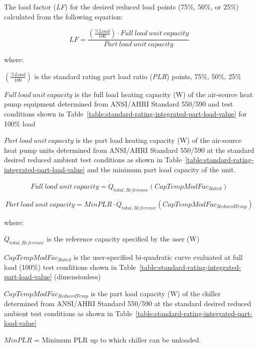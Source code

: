 The load factor (\emph{LF}) for the desired reduced load points (75\%, 50\%, or 25\%) calculated from the following equation:

\begin{equation}
LF = \frac{{\left( {\frac{{\% Load}}{{100}}} \right) \cdot Full~load~unit~capacity}}{{Part~load~unit~capacity}}
\end{equation}

where:

\emph{\(\left( {\frac{{\% Load}}{{100}}} \right)\)} is the standard rating part load ratio (\emph{PLR}) points, 75\%, 50\%, 25\%

\(Full~load~unit~capacity\) is the full load heating capacity (W) of the air-source heat pump equipment determined from ANSI/AHRI Standard 550/590 and test conditions shown in Table~\ref{table:standard-rating-integrated-part-load-value} for 100\% load

\(Part~load~unit~capacity\) is the part load heating capacity (W) of the air-source heat pump units determined from ANSI/AHRI Standard 550/590 at the standard desired reduced ambient test conditions as shown in Table~\ref{table:standard-rating-integrated-part-load-value} and the minimum part load capacity of the unit.

\begin{equation}
Full~load~unit~capacity = {\dot Q_{total,Reference}}\left( {CapTempModFa{c_{Rated}}} \right)
\end{equation}

\begin{equation}
Part~load~unit~capacity = MinPLR \cdot {\dot Q_{total,Reference}}\left( {CapTempModFa{c_{ReducedTemp}}} \right)
\end{equation}

where:

\({\dot Q_{total,Reference}}\) is the reference capacity specified by the user (W)

\(CapTempModFa{c_{Rated}}\) is the user-specified bi-quadratic curve evaluated at full load (100\%) test conditions shown in Table~\ref{table:standard-rating-integrated-part-load-value} (dimensionless)

\(CapTempModFa{c_{ReducedTemp}}\) is the part load capacity (W) of the chiller determined from ANSI/AHRI Standard 550/590 at the standard desired reduced ambient test conditions as shown in Table~\ref{table:standard-rating-integrated-part-load-value}

\(MinPLR\) = Minimum PLR up to which chiller can be unloaded.

